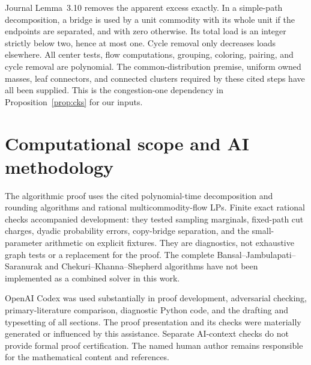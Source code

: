 \documentclass[acmsmall,11pt,screen,nonacm]{acmart}
\begin{document}
Journal Lemma~3.10 removes the apparent excess exactly. In a simple-path
decomposition, a bridge is used by a unit commodity with its whole unit
if the endpoints are separated, and with zero otherwise. Its total load
is an integer strictly below two, hence at most one. Cycle removal only
decreases loads elsewhere. All center tests, flow computations, grouping,
coloring, pairing, and cycle removal are polynomial. The common-distribution
premise, uniform owned masses, leaf connectors, and connected clusters
required by these cited steps have all been supplied. This is the
congestion-one dependency in Proposition~\ref{prop:cks} for our inputs.

\section*{Computational scope and AI methodology}

The algorithmic proof uses the cited polynomial-time decomposition and
rounding algorithms and rational multicommodity-flow LPs. Finite exact
rational checks accompanied development: they tested sampling marginals,
fixed-path cut charges, dyadic probability errors, copy-bridge separation,
and the small-parameter arithmetic on explicit fixtures. They are diagnostics,
not exhaustive graph tests or a replacement for the proof. The complete
Bansal--Jambulapati--Saranurak and Chekuri--Khanna--Shepherd algorithms have
not been implemented as a combined solver in this work.

OpenAI Codex was used substantially in proof development, adversarial
checking, primary-literature comparison, diagnostic Python code, and the
drafting and typesetting of all sections. The proof presentation and its
checks were materially generated or influenced by this assistance. Separate
AI-context checks do not provide formal proof certification. The named human
author remains responsible for the mathematical content and references.



\end{document}
